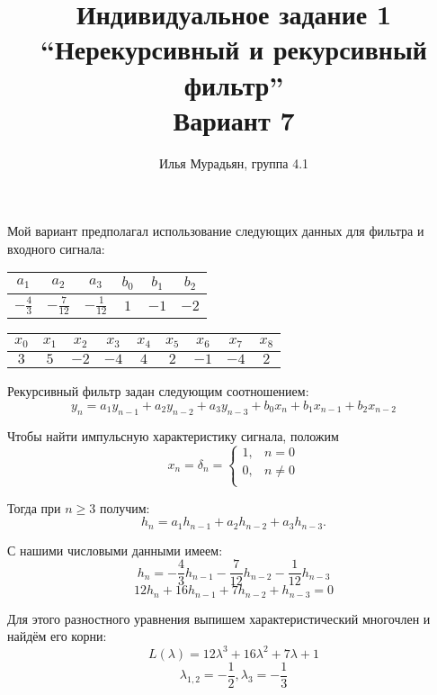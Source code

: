 \documentclass[a4paper,14pt]{article}
\title{Индивидуальное задание 1\\
	``Нерекурсивный и рекурсивный фильтр''\\
	Вариант 7}
\author{Илья Мурадьян, группа 4.1}
\begin{document}
	\Large
	
	\maketitle
	
	Мой вариант предполагал использование следующих данных для фильтра и входного сигнала:
	\par \vspace{0.3cm}
	
	\bgroup
	\def\arraystretch{1.5}
	\begin{tabular}{|c|c|c|c|c|c|}
		\hline
		$a_1$ & $a_2$ & $a_3$ & $b_0$ & $b_1$ & $b_2$ \\
		\hline
		$-\frac{4}{3}$ & $-\frac{7}{12}$ & $-\frac{1}{12}$ & $1$ & $-1$ & $-2$ \\
		\hline
	\end{tabular}
	\egroup
	\par \vspace{0.3cm}
	\begin{tabular}{|c|c|c|c|c|c|c|c|c|}
		\hline
		$x_0$ & $x_1$ & $x_2$ & $x_3$ & $x_4$ & $x_5$ & $x_6$ & $x_7$ & $x_8$ \\
		\hline
		$3$ & $5$ & $-2$ & $-4$ & $4$ & $2$ & $-1$ & $-4$ & $2$ \\
		\hline
	\end{tabular}

	\vspace{0.3cm}
	Рекурсивный фильтр задан следующим соотношением:
	\begin{equation} \label{eq:recfilt}
		y_n = a_1 y_{n-1} + a_2 y_{n-2} + a_3 y_{n-3} + b_0 x_n + b_1 x_{n-1} + b_2 x_{n-2}
	\end{equation}
	
	Чтобы найти импульсную характеристику сигнала, положим 
	\[x_n = \delta_n = \begin{cases}
	1, & n = 0 \\
	0, & n \ne 0 \\
	\end{cases} \]
	
	Тогда при $n \ge 3$ получим:
	\begin{equation} \label{eq:rfilt}
	h_n = a_1 h_{n-1} + a_2 h_{n-2} + a_3 h_{n-3}.
	\end{equation}
	
	С нашими числовыми данными имеем:
	\[h_n = -\frac{4}{3} h_{n-1} -\frac{7}{12} h_{n-2} -\frac{1}{12} h_{n-3}\]
	\[12 h_n + 16 h_{n-1} + 7 h_{n-2} + h_{n-3} = 0\]
	
	Для этого разностного уравнения выпишем характеристический многочлен и найдём его корни:
	\[L(\lambda) = 12 \lambda^3 + 16 \lambda^2 + 7 \lambda + 1\]
	\[ \lambda_{1, 2} = -\frac{1}{2}, \lambda_{3} = -\frac{1}{3} \]
	
\end{document}
